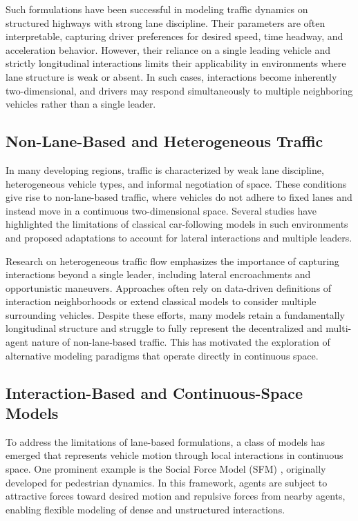 \documentclass[conference]{IEEEtran}
\begin{document}
Such formulations have been successful in modeling traffic dynamics on structured highways with strong lane discipline. Their parameters are often interpretable, capturing driver preferences for desired speed, time headway, and acceleration behavior. However, their reliance on a single leading vehicle and strictly longitudinal interactions limits their applicability in environments where lane structure is weak or absent. In such cases, interactions become inherently two-dimensional, and drivers may respond simultaneously to multiple neighboring vehicles rather than a single leader.

\subsection{Non-Lane-Based and Heterogeneous Traffic}
In many developing regions, traffic is characterized by weak lane discipline, heterogeneous vehicle types, and informal negotiation of space. These conditions give rise to non-lane-based traffic, where vehicles do not adhere to fixed lanes and instead move in a continuous two-dimensional space. Several studies have highlighted the limitations of classical car-following models in such environments and proposed adaptations to account for lateral interactions and multiple leaders.

Research on heterogeneous traffic flow emphasizes the importance of capturing interactions beyond a single leader, including lateral encroachments and opportunistic maneuvers. Approaches often rely on data-driven definitions of interaction neighborhoods or extend classical models to consider multiple surrounding vehicles. Despite these efforts, many models retain a fundamentally longitudinal structure and struggle to fully represent the decentralized and multi-agent nature of non-lane-based traffic. This has motivated the exploration of alternative modeling paradigms that operate directly in continuous space.

\subsection{Interaction-Based and Continuous-Space Models}
To address the limitations of lane-based formulations, a class of models has emerged that represents vehicle motion through local interactions in continuous space. One prominent example is the Social Force Model (SFM) \cite{helbing1995socialforce}, originally developed for pedestrian dynamics. In this framework, agents are subject to attractive forces toward desired motion and repulsive forces from nearby agents, enabling flexible modeling of dense and unstructured interactions.
\end{document}
